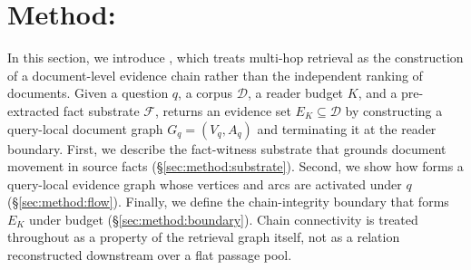 %
%
%
%

\section{Method: \methodname{}}
\label{sec:method}

In this section, we introduce \methodname{}, which treats multi-hop retrieval
as the construction of a document-level evidence chain rather than the
independent ranking of documents. Given a question $q$, a corpus
$\mathcal{D}$, a reader budget $K$, and a pre-extracted fact substrate
$\mathcal{F}$, \methodname{} returns an evidence set
$E_K \subseteq \mathcal{D}$ by constructing a query-local document graph
$G_q=(V_q,A_q)$ and terminating it at the reader boundary. First, we describe
the fact-witness substrate that grounds document movement in source facts
(\S\ref{sec:method:substrate}). Second, we show how \methodname{} forms a
query-local evidence graph whose vertices and arcs are activated under $q$
(\S\ref{sec:method:flow}). Finally, we define the chain-integrity boundary
that forms $E_K$ under budget (\S\ref{sec:method:boundary}). Chain
connectivity is treated throughout as a property of the retrieval graph
itself, not as a relation reconstructed downstream over a flat passage pool.

